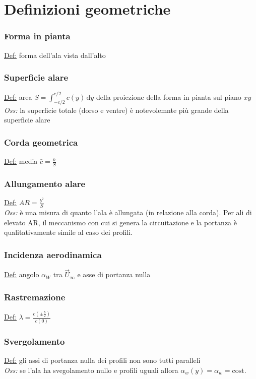 \documentclass[11pt,a4paper]{report}
\newcommand{\de}{\mathrm d}
\begin{document}
	\section{Definizioni geometriche}
			\subsubsection{Forma in pianta}
			\underline{Def:} forma dell'ala vista dall'alto
			\subsubsection{Superficie alare}
			\underline{Def:} area $S=\int_{-c/2}^{c/2}c(y)\,\de y$ della proiezione della forma in pianta sul piano $xy$\\
			\textit{Oss:} la superficie totale (dorso e ventre) è notevolemnte più grande della superficie alare
			\subsubsection{Corda geometrica}
			\underline{Def:} media $\bar c=\frac bS$
			\subsubsection{Allungamento alare}
			\underline{Def:} $A\!R=\frac{b^2}{S}$\\
			\textit{Oss:} è una misura di quanto l'ala è allungata (in relazione alla corda). Per ali di elevato A\!R, il meccanismo con cui si genera la circuitazione e la portanza è qualitativamente simile al caso dei profili.
			\subsubsection{Incidenza aerodinamica}
			\underline{Def:} angolo $\alpha_W$ tra $\vec U_\infty$ e asse di portanza nulla
			\subsubsection{Rastremazione}
			\underline{Def:} $\lambda=\frac{c(\pm\frac b2)}{c(0)}$
			\subsubsection{Svergolamento}
			\underline{Def:} gli assi di portanza nulla dei profili non sono tutti paralleli\\
			\textit{Oss:} se l'ala ha svegolamento nullo e profili uguali allora $\alpha_w(y)=\alpha_w=\text{cost}$.
			
\end{document}
